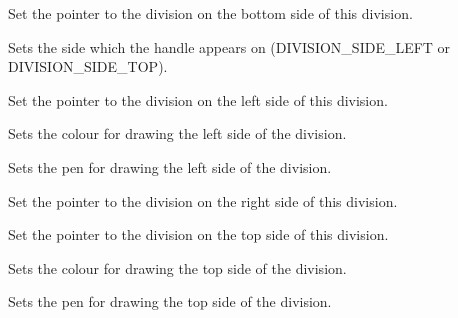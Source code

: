 Set the pointer to the division on the bottom side of this division.



Sets the side which the handle appears on (DIVISION\_SIDE\_LEFT or DIVISION\_SIDE\_TOP).



Set the pointer to the division on the left side of this division.



Sets the colour for drawing the left side of the division.



Sets the pen for drawing the left side of the division.



Set the pointer to the division on the right side of this division.



Set the pointer to the division on the top side of this division.



Sets the colour for drawing the top side of the division.



Sets the pen for drawing the top side of the division.

\section{}\label{wxellipseshape}

